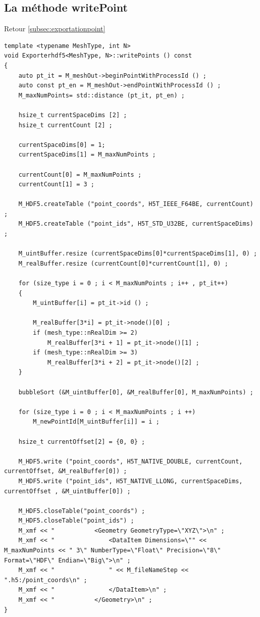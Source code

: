 \documentclass[12pt]{article}
\begin{document}
\subsection {La méthode writePoint}
\label{subsec:writePoint}
Retour \ref{subsec:exportationpoint}
\begin{lstlisting}
template <typename MeshType, int N>
void Exporterhdf5<MeshType, N>::writePoints () const 
{
    auto pt_it = M_meshOut->beginPointWithProcessId () ;
    auto const pt_en = M_meshOut->endPointWithProcessId () ;
    M_maxNumPoints= std::distance (pt_it, pt_en) ;

    hsize_t currentSpaceDims [2] ;
    hsize_t currentCount [2] ;

    currentSpaceDims[0] = 1;
    currentSpaceDims[1] = M_maxNumPoints ;

    currentCount[0] = M_maxNumPoints ;
    currentCount[1] = 3 ;

    M_HDF5.createTable ("point_coords", H5T_IEEE_F64BE, currentCount) ;
    M_HDF5.createTable ("point_ids", H5T_STD_U32BE, currentSpaceDims) ;

    M_uintBuffer.resize (currentSpaceDims[0]*currentSpaceDims[1], 0) ;
    M_realBuffer.resize (currentCount[0]*currentCount[1], 0) ;

    for (size_type i = 0 ; i < M_maxNumPoints ; i++ , pt_it++) 
    {
        M_uintBuffer[i] = pt_it->id () ;

        M_realBuffer[3*i] = pt_it->node()[0] ;
        if (mesh_type::nRealDim >= 2)
            M_realBuffer[3*i + 1] = pt_it->node()[1] ;
        if (mesh_type::nRealDim >= 3)
            M_realBuffer[3*i + 2] = pt_it->node()[2] ;
    }

    bubbleSort (&M_uintBuffer[0], &M_realBuffer[0], M_maxNumPoints) ;

    for (size_type i = 0 ; i < M_maxNumPoints ; i ++) 
        M_newPointId[M_uintBuffer[i]] = i ;

    hsize_t currentOffset[2] = {0, 0} ;

    M_HDF5.write ("point_coords", H5T_NATIVE_DOUBLE, currentCount, currentOffset, &M_realBuffer[0]) ;
    M_HDF5.write ("point_ids", H5T_NATIVE_LLONG, currentSpaceDims, currentOffset , &M_uintBuffer[0]) ;

    M_HDF5.closeTable("point_coords") ;
    M_HDF5.closeTable("point_ids") ;    
    M_xmf << "           <Geometry GeometryType=\"XYZ\">\n" ;
    M_xmf << "               <DataItem Dimensions=\"" << M_maxNumPoints << " 3\" NumberType=\"Float\" Precision=\"8\" Format=\"HDF\" Endian=\"Big\">\n" ;
    M_xmf << "               " << M_fileNameStep << ".h5:/point_coords\n" ;
    M_xmf << "               </DataItem>\n" ;
    M_xmf << "           </Geometry>\n" ;
}
\end{lstlisting}
\newpage
\end{document}
